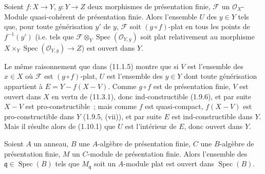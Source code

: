 
\begin{corollary}[11.3.2]
\label{IV.11.3.2-fr}
Soient $f:X\to Y$, $g:Y\to Z$ deux morphismes de présentation finie,
$\mathcal F$ un $\mathcal O_X$-Module quasi-cohérent de présentation finie.
Alors l'ensemble $U$ des $y\in Y$ tels que, pour toute générisation $y'$ de
$y$, $\mathcal F$ soit $(g\circ f)$-plat en tous les points de $f^{-1}(y')$
(i.e. tels que $\mathcal F\otimes_Y\operatorname{Spec}(\mathcal O_{Y,y})$
soit plat relativement au morphisme
$X\times_Y\operatorname{Spec}(\mathcal O_{Y,y})\to Z$) est ouvert dans $Y$.
\end{corollary}

Le même raisonnement que dans (11.1.5) montre que si $V$ est l'ensemble des
$x\in X$ où $\mathcal F$ est $(g\circ f)$-plat, $U$ est l'ensemble des $y\in Y$
dont toute générisation appartient à $E=Y-f(X-V)$. Comme $g\circ f$ est de
présentation finie, $V$ est ouvert dans $X$ en vertu de (11.3.1), donc
ind-constructible (1.9.6), et par suite $X-V$ est pro-constructible~; mais comme
$f$ est quasi-compact, $f(X-V)$ est pro-constructible dans $Y$ (1.9.5, (vii)),
et par suite $E$ est ind-constructible dans $Y$. Mais il résulte alors de
(1.10.1) que $U$ est l'intérieur de $E$, donc ouvert dans $Y$.

\begin{corollary}[11.3.3]
\label{IV.11.3.3-fr}
Soient $A$ un anneau, $B$ une $A$-algèbre de présentation finie, $C$ une
$B$-algèbre de présentation finie, $M$ un $C$-module de présentation finie.
Alors l'ensemble des $\mathfrak q\in\operatorname{Spec}(B)$ tels que
$M_\mathfrak q$ soit un $A$-module plat est ouvert dans
$\operatorname{Spec}(B)$.
\end{corollary}

